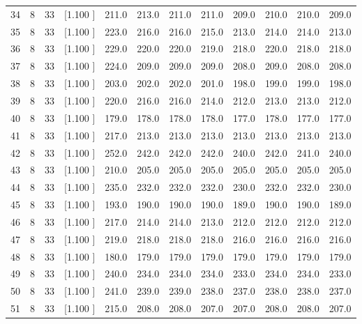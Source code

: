 \documentclass[12pt,a4paper]{article}
\begin{document}
\begin{center}
{\begin{tabular}{r r r r r r r r r r r r}
  34&  8& 33&[1.100     ]&   211.0&   213.0&   211.0&   211.0&   209.0&   210.0&   210.0&   209.0\\[-0.02in]
  35&  8& 33&[1.100     ]&   223.0&   216.0&   216.0&   215.0&   213.0&   214.0&   214.0&   213.0\\[-0.02in]
  36&  8& 33&[1.100     ]&   229.0&   220.0&   220.0&   219.0&   218.0&   220.0&   218.0&   218.0\\[-0.02in]
  37&  8& 33&[1.100     ]&   224.0&   209.0&   209.0&   209.0&   208.0&   209.0&   208.0&   208.0\\[-0.02in]
  38&  8& 33&[1.100     ]&   203.0&   202.0&   202.0&   201.0&   198.0&   199.0&   199.0&   198.0\\[-0.02in]
  39&  8& 33&[1.100     ]&   220.0&   216.0&   216.0&   214.0&   212.0&   213.0&   213.0&   212.0\\[-0.02in]
  40&  8& 33&[1.100     ]&   179.0&   178.0&   178.0&   178.0&   177.0&   178.0&   177.0&   177.0\\[-0.02in]
  41&  8& 33&[1.100     ]&   217.0&   213.0&   213.0&   213.0&   213.0&   213.0&   213.0&   213.0\\[-0.02in]
  42&  8& 33&[1.100     ]&   252.0&   242.0&   242.0&   242.0&   240.0&   242.0&   241.0&   240.0\\[-0.02in]
  43&  8& 33&[1.100     ]&   210.0&   205.0&   205.0&   205.0&   205.0&   205.0&   205.0&   205.0\\[-0.02in]
  44&  8& 33&[1.100     ]&   235.0&   232.0&   232.0&   232.0&   230.0&   232.0&   232.0&   230.0\\[-0.02in]
  45&  8& 33&[1.100     ]&   193.0&   190.0&   190.0&   190.0&   189.0&   190.0&   190.0&   189.0\\[-0.02in]
  46&  8& 33&[1.100     ]&   217.0&   214.0&   214.0&   213.0&   212.0&   212.0&   212.0&   212.0\\[-0.02in]
  47&  8& 33&[1.100     ]&   219.0&   218.0&   218.0&   218.0&   216.0&   216.0&   216.0&   216.0\\[-0.02in]
  48&  8& 33&[1.100     ]&   180.0&   179.0&   179.0&   179.0&   179.0&   179.0&   179.0&   179.0\\[-0.02in]
  49&  8& 33&[1.100     ]&   240.0&   234.0&   234.0&   234.0&   233.0&   234.0&   234.0&   233.0\\[-0.02in]
  50&  8& 33&[1.100     ]&   241.0&   239.0&   239.0&   238.0&   237.0&   238.0&   238.0&   237.0\\[-0.02in]
  51&  8& 33&[1.100     ]&   215.0&   208.0&   208.0&   207.0&   207.0&   208.0&   208.0&   207.0\\[-0.02in]

\end{tabular}}
\end{center}
\end{document}
